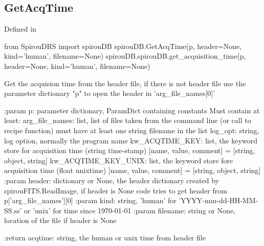 \noindent\begin{minipage}{\textwidth}
\subsection{GetAcqTime}

Defined in \spirouCDB{}

\begin{pythonbox}
from SpirouDRS import spirouDB
spirouDB.GetAcqTime(p, header=None, kind='human', filename=None)
spirouDB.spirouDB.get_acquisition_time(p, header=None, kind='human', filename=None)
\end{pythonbox}

\begin{pythondocstring}
Get the acquision time from the header file, if there is not header file
use the parameter dictionary "p" to open the header in 'arg_file_names[0]'

:param p: parameter dictionary, ParamDict containing constants
    Must contain at least:
            arg_file_names: list, list of files taken from the command line
                            (or call to recipe function) must have at least
                            one string filename in the list
            log_opt: string, log option, normally the program name
            kw_ACQTIME_KEY: list, the keyword store for acquisition time
                            (string time-stamp)
                        [name, value, comment] = [string, object, string]
            kw_ACQTIME_KEY_UNIX: list, the keyword store fore acquisition
                                 time (float unixtime)
                        [name, value, comment] = [string, object, string]
:param header: dictionary or None, the header dictionary created by
               spirouFITS.ReadImage, if header is None code tries to get
               header from p['arg_file_names'][0]
:param kind: string, 'human' for 'YYYY-mm-dd-HH-MM-SS.ss' or 'unix'
             for time since 1970-01-01
:param filename: string or None, location of the file if header is None

:return acqtime: string, the human or unix time from header file
\end{pythondocstring}
\end{minipage}

